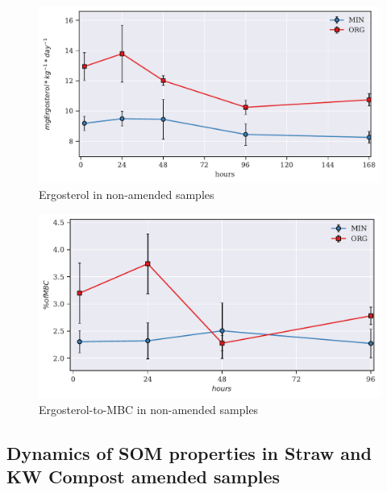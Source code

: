 \documentclass[12pt]{report}
\begin{document}
        \begin{figure}[H]
            \centering
            \includegraphics[scale=0.8]{thesis_figures/preliminary/control/Erg.pdf}
            \caption{Ergosterol in non-amended samples}
            \label{fig:erg_control_preliminary}
        \end{figure}
		
		\begin{figure}[H]
			\centering
			\includegraphics[scale=0.8]{thesis_figures/preliminary/control/Erg-to-MBC_.pdf}
			\caption{Ergosterol-to-MBC in non-amended samples}
			\label{fig:erg_to_mbc_control_preliminary}
		\end{figure}
%			

\subsection{Dynamics of SOM properties in Straw and KW Compost amended samples}

    
\end{document}
